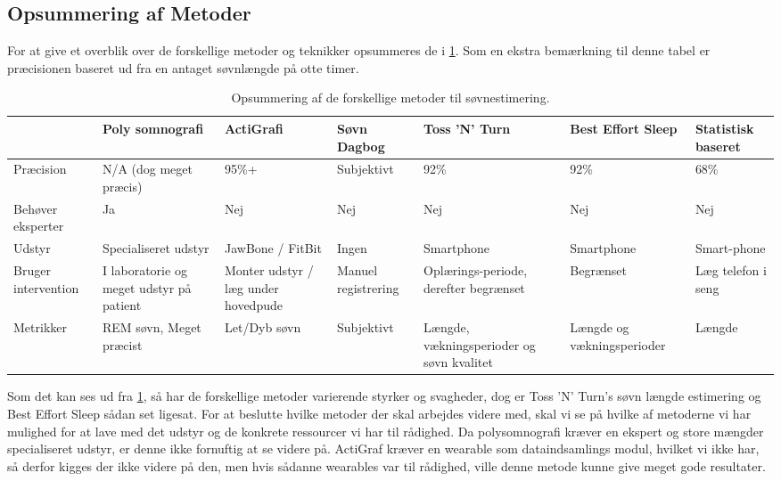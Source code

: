 \subsection{Opsummering af Metoder}
For at give et overblik over de forskellige metoder og teknikker opsummeres de i \cref{tab:opsummeringMetoder}.
Som en ekstra bemærkning til denne tabel er præcisionen baseret ud fra en antaget søvnlængde på otte timer. 

\begin{table}[h]
\begin{tabular}{|p{2cm}|p{2cm}|p{2cm}|p{2cm}|p{2cm}|p{2cm}|p{1.5cm}|}
\hline & Poly somnografi & ActiGrafi & Søvn Dagbog & Toss 'N' Turn & Best Effort Sleep  & Statistisk baseret\\ 
\hline Præcision & N/A (dog meget præcis) & 95\%+ & Subjektivt & 92\% & 92\% & 68\%\\ 
\hline Behøver eksperter & Ja & Nej & Nej & Nej & Nej & Nej \\ 
\hline Udstyr & Specialiseret udstyr & JawBone / FitBit & Ingen & Smartphone & Smartphone & Smart-phone \\ 
\hline Bruger intervention	& I laboratorie og meget udstyr på patient	& Monter udstyr / læg under hovedpude & Manuel registrering  & Oplærings-periode, derefter begrænset & Begrænset & Læg telefon i seng \\ 
\hline Metrikker & REM søvn, Meget præcist	& Let/Dyb søvn & Subjektivt & Længde, vækningsperioder og søvn kvalitet & Længde og vækningsperioder & Længde \\ 
\hline 
\end{tabular}
\caption{Opsummering af de forskellige metoder til søvnestimering.}
\label{tab:opsummeringMetoder}
\end{table}
Som det kan ses ud fra \cref{tab:opsummeringMetoder}, så har de forskellige metoder varierende styrker og svagheder, dog er Toss 'N' Turn's søvn længde estimering og Best Effort Sleep sådan set ligesat.
For at beslutte hvilke metoder der skal arbejdes videre med, skal vi se på hvilke af metoderne vi har mulighed for at lave med det udstyr og de konkrete ressourcer vi har til rådighed.
Da polysomnografi kræver en ekspert og store mængder specialiseret udstyr, er denne ikke fornuftig at se videre på.
ActiGraf kræver en wearable som dataindsamlings modul, hvilket vi ikke har, så derfor kigges der ikke videre på den, men hvis sådanne wearables var til rådighed, ville denne metode kunne give meget gode resultater.

